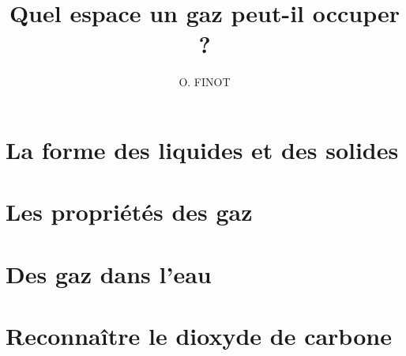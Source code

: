 \documentclass[xcolor={dvipsnames}]{beamer}
\title{Quel espace un gaz peut-il occuper ?}
\author{O. FINOT}\institute{Collège S$^t$ Bernard}
\begin{document}
\begin{frame}
  \titlepage 
\end{frame}

\section{La forme des liquides et des solides}



\begin{frame}
	
\end{frame}


\begin{frame}
	
\end{frame}

\section{Les propriétés des gaz}

\begin{frame}
	
\end{frame}


\begin{frame}
	
\end{frame}

\section{Des gaz dans l'eau}

\begin{frame}
	
\end{frame}


\begin{frame}
	
\end{frame}

\section{Reconnaître le dioxyde de carbone}

\begin{frame}
	
\end{frame}


\begin{frame}
	
\end{frame}
\end{document}
